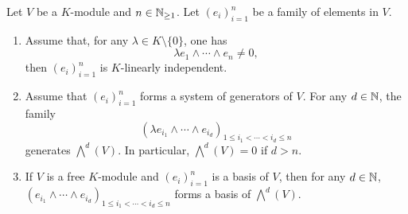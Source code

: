 \begin{theoremenv}\label{thm:4.5.2}
    Let $V$ be a $K$-module and $n\in \mathbb{N}_{\ge 1}$.
    Let $\left(e_i\right)_{i=1}^{n}$ be a family of elements in $V$.
    \begin{enumerate}
        \item Assume that, for any $\lambda \in K\setminus\{0\}$, one has
        $$\lambda e_1 \wedge \cdots \wedge e_n \neq 0,$$
        then $\left(e_i\right)_{i=1}^{n}$ is $K$-linearly independent.
        \item Assume that $\left(e_i\right)_{i=1}^{n}$ forms a system of generators of $V$.
        For any $d \in \mathbb{N}$, the family
        $$ \left(\lambda e_{i_1} \wedge \cdots \wedge e_{i_d}\right)_{1\le i_1< \cdots < i_d \le n}$$
        generates $\bigwedge^d (V)$.
        In particular, $\bigwedge^d (V) = 0$ if $d>n$.
        \item If $V$ is a free $K$-module and $\left(e_i\right)_{i=1}^{n}$ is a basis of $V$,
        then for any $d\in \mathbb{N}$, $\left(e_{i_1} \wedge \cdots \wedge e_{i_d}\right)_{1\le i_1 < \cdots < i_d \le n}$ forms a basis of $\bigwedge^d (V)$.
    \end{enumerate}
\end{theoremenv}
